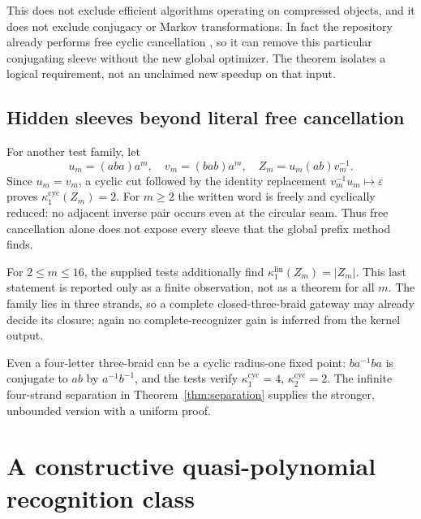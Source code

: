 \documentclass[11pt,a4paper]{article}
\theoremstyle{definition}\newtheorem{definition}[theorem]{Definition}
\theoremstyle{remark}\newtheorem{remark}[theorem]{Remark}
\newcommand{\eps}{\varepsilon}
\newcommand{\kc}[1]{\kappa^{\mathrm{cyc}}_{#1}}
\newcommand{\kl}[1]{\kappa^{\mathrm{lin}}_{#1}}
\begin{document}
This does not exclude efficient algorithms operating on compressed objects,
and it does not exclude conjugacy or Markov transformations. In fact the
repository already performs free cyclic cancellation
\cite{ProveItDescent}, so it can remove this particular conjugating sleeve
without the new global optimizer. The theorem isolates a logical
requirement, not an unclaimed new speedup on that input.

\subsection{Hidden sleeves beyond literal free cancellation}
For another test family, let
\[
 u_m=(aba)a^m,\quad v_m=(bab)a^m,\quad
 Z_m=u_m(ab)v_m^{-1}.
\]
Since $u_m=v_m$, a cyclic cut followed by the identity replacement
$v_m^{-1}u_m\mapsto\eps$ proves $\kc{1}(Z_m)=2$.
For $m\ge2$ the written word is freely and cyclically reduced: no adjacent
inverse pair occurs even at the circular seam. Thus free cancellation
alone does not expose every sleeve that the global prefix method finds.

For $2\le m\le16$, the supplied tests additionally find
$\kl{1}(Z_m)=|Z_m|$. This last statement is reported only as a finite
observation, not as a theorem for all $m$. The family lies in three strands,
so a complete closed-three-braid gateway may already decide its closure;
again no complete-recognizer gain is inferred from the kernel output.

Even a four-letter three-braid can be a cyclic radius-one fixed point:
$ba^{-1}ba$ is conjugate to $ab$ by $a^{-1}b^{-1}$, and the tests verify
$\kc{1}=4$, $\kc{2}=2$. The infinite four-strand separation in
Theorem~\ref{thm:separation} supplies the stronger, unbounded version with
a uniform proof.

\section{A constructive quasi-polynomial recognition class}
\end{document}
